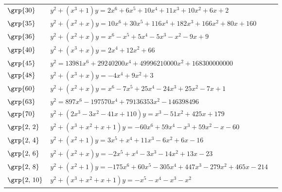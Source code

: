 \begin{longtable}{@{}>{\raggedright\arraybackslash}p{1.35cm}
 >{\raggedright\arraybackslash}p{}
 >{\raggedright\arraybackslash}p{1.25cm}@{}}
$\grp{30}$ & \href{https://alpha.lmfdb.org/Genus2Curve/Q/?jump=[[2,6,10,11,10,6,2],[1,0,0,1]]}{$y^2 + (x^{3}+1)y = 2x^{6}+6x^{5}+10x^{4}+11x^{3}+10x^{2}+6x+2$} & \cite{HLP2000}\\
$\grp{35}$ & \href{https://alpha.lmfdb.org/Genus2Curve/Q/?jump=[[160,80,166,182,116,30,10],[0,1,1]]}{$y^2 + (x^{2}+x)y = 10x^{6}+30x^{5}+116x^{4}+182x^{3}+166x^{2}+80x+160$} & \cite{HLP2000}\\
$\grp{36}$ & \href{https://alpha.lmfdb.org/Genus2Curve/Q/?jump=[[9,-9,-1,-5,5,-1,1],[0,1,1]]}{$y^2 + (x^{2}+x)y = x^{6}-x^{5}+5x^{4}-5x^{3}-x^{2}-9x+9$} & \cite{PP2012b,Platonov2014}\\
$\grp{40}$ & \href{https://alpha.lmfdb.org/Genus2Curve/Q/?jump=[[66,0,12,0,2],[0,1,0,1]]}{$y^2 + (x^{3}+x)y = 2x^{4}+12x^{2}+66$} & \cite{HLP2000}\\
$\grp{45}$ & $y^2 = 13981x^{6}+29240200x^{4}+49996210000x^{2}+168300000000$ & \cite{HLP2000}\\
$\grp{48}$ & \href{https://alpha.lmfdb.org/Genus2Curve/Q/?jump=[[3,0,9,0,-4],[0,1,0,1]]}{$y^2 + (x^{3}+x)y = -4x^{4}+9x^{2}+3$} & \cite{Howe2015, PP2012b,Platonov2014}\\
$\grp{60}$ & \href{https://alpha.lmfdb.org/Genus2Curve/Q/?jump=[[1,-7,25,-24,25,-7,1],[0,1,1]]}{$y^2 + (x^{2}+x)y = x^{6}-7x^{5}+25x^{4}-24x^{3}+25x^{2}-7x+1$} & \cite{HLP2000}\\
$\grp{63}$ & $y^2 = 897x^{6}-197570x^{4}+79136353x^{2}-146398496$ & \cite{HLP2000}\\
$\grp{70}$ & $y^2 + (2x^{3}-3x^{2}-41x+110)y = x^{3}-51x^{2}+425x+179$ & \cite{Howe2015}\\
$\grp{2,\,2}$ & \href{https://alpha.lmfdb.org/Genus2Curve/Q/?jump=[[-60,-1,59,-1,59,0,-60],[1,1,1,1]]}{$y^2 + (x^{3}+x^{2}+x+1)y = -60x^{6}+59x^{4}-x^{3}+59x^{2}-x-60$} & \cite{BSSVY}\\
$\grp{2,\,4}$ & \href{https://alpha.lmfdb.org/Genus2Curve/Q/?jump=[[-16,6,-6,11,1,3],[1,0,1]]}{$y^2 + (x^{2}+1)y = 3x^{5}+x^{4}+11x^{3}-6x^{2}+6x-16$} & \cite{BSSVY}\\
$\grp{2,\,6}$ & \href{https://alpha.lmfdb.org/Genus2Curve/Q/?jump=[[-23,13,-14,-3,1,-2],[0,1,1]]}{$y^2 + (x^{2}+x)y = -2x^{5}+x^{4}-3x^{3}-14x^{2}+13x-23$} & \cite{BSSVY}\\
$\grp{2,\,8}$ & \href{https://alpha.lmfdb.org/Genus2Curve/Q/?jump=[[-214,465,-279,447,-305,60,-175],[1,0,1]]}{$y^2 + (x^{2}+1)y = -175x^{6}+60x^{5}-305x^{4}+447x^{3}-279x^{2}+465x-214$} & \cite{BSSVY}\\
$\grp{2,\,10}$ & \href{https://www.lmfdb.org/Genus2Curve/Q/256/a/512/1}{$y^2 + (x^{3}+x^{2}+x+1)y = -x^{5}-x^{4}-x^{3}-x^{2}$} & \cite{Ogg1973}\\

\end{longtable}
